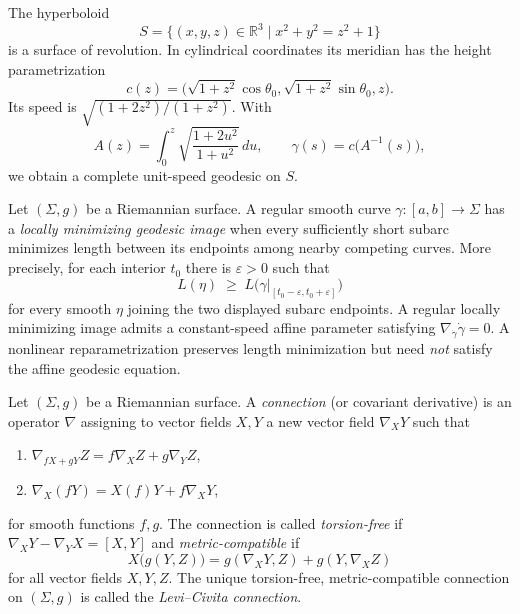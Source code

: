 \begin{solution}
	\begin{example}
		The hyperboloid
		\[
		S=\{(x,y,z)\in\mathbb R^3 \mid x^2 + y^2 = z^2 + 1\}
		\]
		is a surface of revolution. In cylindrical coordinates its
		meridian has the height parametrization
		\[
		c(z)=\bigl(\sqrt{1+z^2}\cos\theta_0,
		\sqrt{1+z^2}\sin\theta_0,z\bigr).
		\]
		Its speed is $\sqrt{(1+2z^2)/(1+z^2)}$. With
		\[
		A(z)=\int_0^z\sqrt{\frac{1+2u^2}{1+u^2}}\,du,
		\qquad \gamma(s)=c\bigl(A^{-1}(s)\bigr),
		\]
		we obtain a complete unit-speed geodesic on $S$.
	\end{example}
	\begin{definition}
		Let $(\Sigma,g)$ be a Riemannian surface. A regular smooth curve
		$\gamma:[a,b]\to\Sigma$ has a \emph{locally minimizing geodesic
		image} when every sufficiently short subarc minimizes length between
		its endpoints among nearby competing curves. More precisely, for
		each interior $t_0$ there is $\varepsilon>0$ such that
		\[
		L(\eta)\;\ge\;
		L\bigl(\gamma|_{[t_0-\varepsilon,t_0+\varepsilon]}\bigr)
		\]
		for every smooth $\eta$ joining the two displayed subarc endpoints.
		A regular locally minimizing image admits a constant-speed affine
		parameter satisfying $\nabla_{\dot\gamma}\dot\gamma=0$.
		A nonlinear reparametrization preserves length minimization but need
		\emph{not} satisfy the affine geodesic equation.
	\end{definition}
	
	\begin{definition}
		Let $(\Sigma,g)$ be a Riemannian surface.
		A \emph{connection} (or covariant derivative) is an operator
		$\nabla$ assigning to vector fields $X,Y$ a new vector field
		$\nabla_X Y$ such that
		\begin{enumerate}
			\item $\nabla_{fX+gY}Z = f\nabla_X Z + g\nabla_Y Z$,
			\item $\nabla_X(fY) = X(f)Y + f\nabla_X Y$,
		\end{enumerate}
		for smooth functions $f,g$.
		The connection is called \emph{torsion-free} if
		$\nabla_X Y - \nabla_Y X = [X,Y]$ and \emph{metric-compatible} if
		\[
		X\bigl(g(Y,Z)\bigr) =
		g(\nabla_X Y,Z)+g(Y,\nabla_X Z)
		\]
		for all vector fields $X,Y,Z$.
		The unique torsion-free, metric-compatible connection on
		$(\Sigma,g)$ is called the \emph{Levi--Civita connection}.
	\end{definition}
	

\end{solution}
